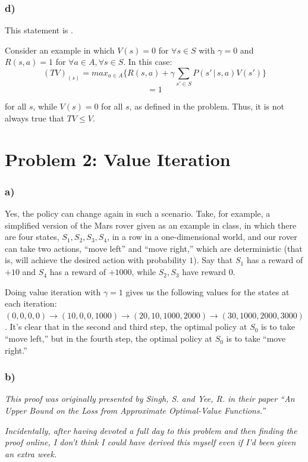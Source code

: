\documentclass[11pt]{scrartcl}
\begin{document}
\subsubsection*{d)}
This statement is .

Consider an example in which $V(s) = 0$ for $\forall s \in S$ with $\gamma = 0$ and $R(s,a) = 1$ for $\forall a \in A, \forall s \in S$. In this case:
$$(TV)_{(s)} = max_{a \in A} \bigg\{R(s,a) + \gamma \sum_{s' \in S} P(s' \, | \, s,a) V(s') \bigg\}$$
$$= 1$$

for all $s$, while $V(s) = 0$ for all $s$, as defined in the problem. Thus, it is not always true that $TV \leq V$.
 
\section*{Problem 2: Value Iteration}
\subsubsection*{a)}
Yes, the policy can change again in such a scenario. Take, for example, a simplified version of the Mars rover given as an example in class, in which there are four states, $S_1, S_2, S_3, S_4$, in a row in a one-dimensional world, and our rover can take two actions, ``move left'' and ``move right,'' which are deterministic (that is, will achieve the desired action with probability $1$). Say that $S_1$ has a reward of $+10$ and $S_4$ has a reward of $+1000$, while $S_2, S_3$ have reward $0$.

Doing value iteration with $\gamma = 1$ gives us the following values for the states at each iteration: $(0,0,0,0) \to (10,0,0,1000) \to (20,10,1000,2000) \to (30,1000,2000,3000)$. It's clear that in the second and third step, the optimal policy at $S_0$ is to take ``move left,'' but in the fourth step, the optimal policy at $S_0$ is to take ``move right.''

\subsubsection*{b)}
\emph{This proof was originally presented by Singh, S. and Yee, R. in their paper ``An Upper Bound on the Loss from Approximate Optimal-Value Functions.''}

\emph{Incidentally, after having devoted a full day to this problem and then finding the proof online, I don't think I could have derived this myself even if I'd been given an extra week.}
\end{document}
